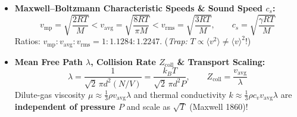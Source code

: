 \documentclass[10pt,twoside,openany,letterpaper]{book}
\begin{document}
\begin{quicksheet}
\begin{twocol}[0.49]
\begin{formulacard}
\begin{itemize}
\[  \]
  \item \textbf{Maxwell--Boltzmann Characteristic Speeds \& Sound Speed $c_s$:}
  \[
    v_{\mathrm{mp}} = \sqrt{\frac{2RT}{M}} < v_{\mathrm{avg}} = \sqrt{\frac{8RT}{\pi M}} < v_{\mathrm{rms}} = \sqrt{\frac{3RT}{M}}, \qquad c_s = \sqrt{\frac{\gamma RT}{M}}
  \]
  Ratios: $v_{\mathrm{mp}} : v_{\mathrm{avg}} : v_{\mathrm{rms}} = 1 : 1.1284 : 1.2247$. (\emph{Trap:} $T \propto \langle v^2\rangle \ne \langle v\rangle^2$!)
  \item \textbf{Mean Free Path $\lambda$, Collision Rate $Z_{\mathrm{coll}}$ \& Transport Scaling:}
  \[
    \boxed{\lambda = \frac{1}{\sqrt{2}\,\pi d^2(N/V)} = \frac{k_B T}{\sqrt{2}\,\pi d^2 P}}, \qquad Z_{\mathrm{coll}} = \frac{v_{\mathrm{avg}}}{\lambda}
  \]
  Dilute-gas viscosity $\mu \approx \frac{1}{3}\rho v_{\mathrm{avg}}\lambda$ and thermal conductivity $k \approx \frac{1}{3}\rho c_v v_{\mathrm{avg}}\lambda$ are \textbf{independent of pressure $P$} and scale as $\sqrt{T}$ (Maxwell 1860)!
\end{itemize}
\end{formulacard}
\end{twocol}


\end{quicksheet}
\end{document}
